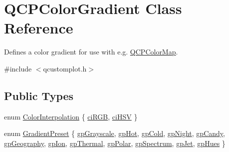 \hypertarget{class_q_c_p_color_gradient}{}\section{Q\+C\+P\+Color\+Gradient Class Reference}
\label{class_q_c_p_color_gradient}


Defines a color gradient for use with e.\+g. \hyperlink{class_q_c_p_color_map}{Q\+C\+P\+Color\+Map}.  




{\ttfamily \#include $<$qcustomplot.\+h$>$}

\subsection*{Public Types}
\begin{DoxyCompactItemize}
\item 
enum \hyperlink{class_q_c_p_color_gradient_ac5dca17cc24336e6ca176610e7f77fc1}{Color\+Interpolation} \{ \hyperlink{class_q_c_p_color_gradient_ac5dca17cc24336e6ca176610e7f77fc1a5e30f725c9cfe93999e268a9f92afbe7}{ci\+R\+GB}, 
\hyperlink{class_q_c_p_color_gradient_ac5dca17cc24336e6ca176610e7f77fc1af14ae62fcae11ecc07234eeaec5856cb}{ci\+H\+SV}
 \}
\item 
enum \hyperlink{class_q_c_p_color_gradient_aed6569828fee337023670272910c9072}{Gradient\+Preset} \{ \newline
\hyperlink{class_q_c_p_color_gradient_aed6569828fee337023670272910c9072add11ae369a86f3b1b6205ec72e5021fb}{gp\+Grayscale}, 
\hyperlink{class_q_c_p_color_gradient_aed6569828fee337023670272910c9072a4f42e534cf6cff5a29a5388094d099b5}{gp\+Hot}, 
\hyperlink{class_q_c_p_color_gradient_aed6569828fee337023670272910c9072aec8c001f62c0d5cb853db5fd85309557}{gp\+Cold}, 
\hyperlink{class_q_c_p_color_gradient_aed6569828fee337023670272910c9072a1bb89351b6def7d220973443fe059c62}{gp\+Night}, 
\newline
\hyperlink{class_q_c_p_color_gradient_aed6569828fee337023670272910c9072a9e72663bf6b94b65945f7843f24e0721}{gp\+Candy}, 
\hyperlink{class_q_c_p_color_gradient_aed6569828fee337023670272910c9072a382f0b07cec1a59d8a533438aea815d2}{gp\+Geography}, 
\hyperlink{class_q_c_p_color_gradient_aed6569828fee337023670272910c9072a4297f4f9e212a819cd65e8e34567182b}{gp\+Ion}, 
\hyperlink{class_q_c_p_color_gradient_aed6569828fee337023670272910c9072af1676b129f9f458ace453f280c731cf7}{gp\+Thermal}, 
\newline
\hyperlink{class_q_c_p_color_gradient_aed6569828fee337023670272910c9072ab7414ce4e36dc3e82e0132a7f0f41b52}{gp\+Polar}, 
\hyperlink{class_q_c_p_color_gradient_aed6569828fee337023670272910c9072ad63adc100ef46f6b4a8a6deacec4642f}{gp\+Spectrum}, 
\hyperlink{class_q_c_p_color_gradient_aed6569828fee337023670272910c9072a5f8a9e67b64c17ddfe4f069fe2b9fb02}{gp\+Jet}, 
\hyperlink{class_q_c_p_color_gradient_aed6569828fee337023670272910c9072a30efe58407acfb67939032f70213a130}{gp\+Hues}
 \}
\end{DoxyCompactItemize}
